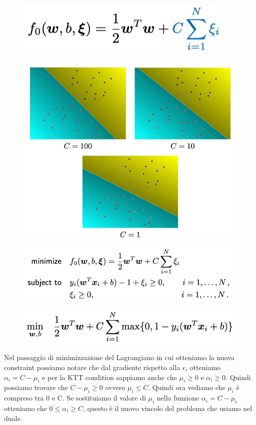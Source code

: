 \documentclass[14pt]{extreport}
\begin{document}
\begin{figure}[H]
\centering
  \includegraphics[width=0.7\linewidth]{325.jpeg}
\end{figure}
\begin{figure}[H]
\centering
  \includegraphics[width=0.7\linewidth]{326.jpeg}
\end{figure}
\begin{figure}[H]
\centering
  \includegraphics[width=0.7\linewidth]{327.jpeg}
\end{figure}
\begin{figure}[H]
\centering
  \includegraphics[width=0.7\linewidth]{328.jpeg}
\end{figure}


Nel passaggio di minimizzazione del Lagrangiano in cui otteniamo la nuova constraint possiamo notare che dal gradiente rispetto alla $\epsilon_i$
otteniamo $\alpha_i = C - \mu_i$ e per la KTT condition sappiamo anche che $\mu_i \geq 0$ e $\alpha_i \geq 0$. Quindi possiamo trovare che $C-\mu_i
\geq 0 $ ovvero $\mu_i \leq C$. Quindi ora vediamo che $\mu_i$ è compreso tra 0 e C. Se sostituiamo il valore di $\mu_i$ nella funzione $\alpha_i = C
- \mu_i$ otteniamo che $0 \leq \alpha_i \geq C$, questo è il nuovo vincolo del problema che usiamo nel duale.
\end{document}
